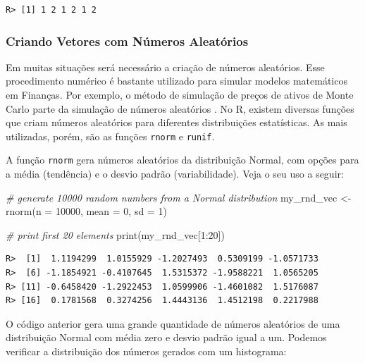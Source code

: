 \documentclass[
  11pt,
]{book}
\newenvironment{Shaded}{\begin{snugshade}}{\end{snugshade}}
\newcommand{\AttributeTok}[1]{\textcolor[rgb]{0.61,0.61,0.61}{#1}}
\newcommand{\CommentTok}[1]{\textcolor[rgb]{0.37,0.37,0.37}{\textit{#1}}}
\newcommand{\DecValTok}[1]{\textcolor[rgb]{0.06,0.06,0.06}{#1}}
\newcommand{\FunctionTok}[1]{\textcolor[rgb]{0,0,0}{#1}}
\newcommand{\NormalTok}[1]{#1}
\newcommand{\OtherTok}[1]{\textcolor[rgb]{0.37,0.37,0.37}{#1}}
\newcommand{\SpecialCharTok}[1]{\textcolor[rgb]{0,0,0}{#1}}
\begin{document}
\begin{verbatim}
R> [1] 1 2 1 2 1 2
\end{verbatim}

\hypertarget{criando-vetores-com-nuxfameros-aleatuxf3rios}{%
\subsubsection{Criando Vetores com Números Aleatórios}\label{criando-vetores-com-nuxfameros-aleatuxf3rios}}

Em muitas situações será necessário a criação de números aleatórios. Esse procedimento numérico é bastante utilizado para simular modelos matemáticos em Finanças. Por exemplo, o método de simulação de preços de ativos de Monte Carlo parte da simulação de números aleatórios \citep{mcleish2011monte}. No R, existem diversas funções que criam números aleatórios para diferentes distribuições estatísticas. As mais utilizadas, porém, são as funções \texttt{rnorm} e \texttt{runif}.  

A função \texttt{rnorm} gera números aleatórios da distribuição Normal, com opções para a média (tendência) e o desvio padrão (variabilidade). Veja o seu uso a seguir:

\begin{Shaded}
\begin{Highlighting}[]
\CommentTok{\# generate 10000 random numbers from a Normal distribution}
\NormalTok{my\_rnd\_vec }\OtherTok{\textless{}{-}} \FunctionTok{rnorm}\NormalTok{(}\AttributeTok{n =} \DecValTok{10000}\NormalTok{,}
                    \AttributeTok{mean =} \DecValTok{0}\NormalTok{,}
                    \AttributeTok{sd =} \DecValTok{1}\NormalTok{)}

\CommentTok{\# print first 20 elements}
\FunctionTok{print}\NormalTok{(my\_rnd\_vec[}\DecValTok{1}\SpecialCharTok{:}\DecValTok{20}\NormalTok{])}
\end{Highlighting}
\end{Shaded}

\begin{verbatim}
R>  [1]  1.1194299  1.0155929 -1.2027493  0.5309199 -1.0571733
R>  [6] -1.1854921 -0.4107645  1.5315372 -1.9588221  1.0565205
R> [11] -0.6458420 -1.2922453  1.0599906 -1.4601082  1.5176087
R> [16]  0.1781568  0.3274256  1.4443136  1.4512198  0.2217988
\end{verbatim}

O código anterior gera uma grande quantidade de números aleatórios de uma distribuição Normal com média zero e desvio padrão igual a um. Podemos verificar a distribuição dos números gerados com um histograma:
\end{document}

